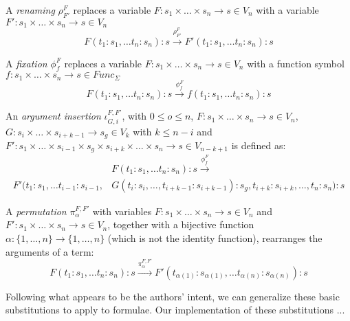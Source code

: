 \documentclass[12pt,a4paper]{article}
\begin{document}
\begin{definition}[Renaming]
    A \textit{renaming} $\rho^F_{F'}$ replaces a variable $F : s_1 \times \dots \times s_n \to s \in V_n$ with a variable $F' : s_1 \times \dots \times s_n \to s \in V_n$ $$F(t_1 : s_1, \dots t_n : s_n) : s \xrightarrow{\rho^F_{F'}}F'(t_1 : s_1, \dots t_n : s_n) : s$$
\end{definition}

\begin{definition}[Fixation]
    A \textit{fixation} $\phi^F_f$ replaces a variable $F : s_1 \times \dots \times s_n \to s \in V_n$ with a function symbol $f : s_1 \times \dots \times s_n \to s \in Func_\Sigma$ $$F(t_1 : s_1, \dots t_n : s_n) : s \xrightarrow{\phi^F_f}f(t_1 : s_1, \dots t_n : s_n) : s$$
\end{definition}

\begin{definition}
    An \textit{argument insertion} $\iota^{F,F'}_{G,i}$, with $0 \le o \le n$, $F : s_1 \times \dots \times s_n \to s \in V_n$, $G : s_i \times \dots \times s_{i+k-1} \to s_g \in V_k$ with $k \le n - i$ and $F' : s_1 \times \dots \times s_{i-1} \times s_g \times s_{i+k} \times \dots \times s_n \to s \in V_{n-k+1}$ is defined as: 
    \begin{align*}
        &F(t_1 : s_1, \dots t_n : s_n) : s \xrightarrow{\phi^F_f}\\
        F'(t_1 : s_1,  \dots t_{i-1} : s_{i-1}, & G (t_i : s_i, \dots, t_{i+k-1} : s_{i+k-1}) : s_g, t_{i+k} : s_{i+k}, \dots, t_n : s_n) :s
    \end{align*}
\end{definition}

\begin{definition}[Permutation]
    A \textit{permutation} $\pi^{F,F'}_{\alpha}$ with variables $F : s_1 \times \dots \times s_n \to s \in V_n$ and $F' : s_1 \times \dots \times s_n \to s \in V_n$, together with a bijective function $\alpha : \{1, \dots, n\} \to \{1, \dots, n\}$ (which is not the identity function), rearranges the arguments of a term:
    $$F(t_1 : s_1, \dots t_n : s_n) : s \xrightarrow{\pi^{F,F'}_{\alpha}} F'(t_{\alpha(1)} : s_{\alpha(1)}, \dots t_{\alpha(n)} : s_{\alpha(n)}) : s$$
\end{definition}

Following what appears to be the authors' intent, we can generalize these basic substitutions to apply to formulae. Our implementation of these substitutions ...
\end{document}

